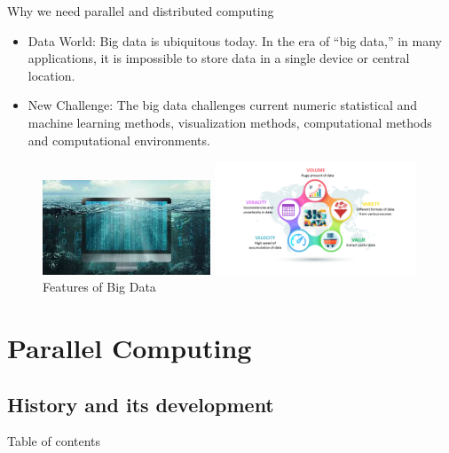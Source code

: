 \documentclass[10pt,aspectratio=169]{beamer}
\begin{document}
\begin{sloppypar}
\begin{frame}{Why we need parallel and distributed computing}  
	\begin{itemize}
		\item {\color{blue}Data World}: Big data is ubiquitous today. In the era of “big data,” in many applications, it is impossible to store data in a single device or central location.
		\item {\color{blue}New Challenge}: The big data challenges current numeric statistical and	machine learning methods, visualization methods, computational methods and computational environments.  
	\end{itemize} 
\begin{figure}[htbp]
	\centering
	\begin{minipage}[t]{0.48\textwidth}
		\centering
		\includegraphics[width=5cm]{picture//2}
		\caption{Are we drowning in a sea of Big Data}
	\end{minipage}
	\begin{minipage}[t]{0.48\textwidth}
		\centering
		\includegraphics[width=6cm]{picture//3}
		\caption{Features of Big Data}
	\end{minipage}
\end{figure}
\end{frame}


\section{Parallel Computing}
\subsection{History and its development}
\begin{frame}[shrink]{Table of contents}
        \tableofcontents[sectionstyle=show/shaded,subsectionstyle=show/shaded/hide]
 \end{frame}




\end{sloppypar}
\end{document}
